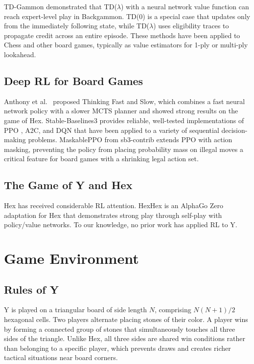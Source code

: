 \documentclass[conference]{IEEEtran}
\begin{document}
TD-Gammon \cite{tesauro1995} demonstrated that TD($\lambda$) with a neural
network value function can reach expert-level play in Backgammon. TD(0) is a
special case that updates only from the immediately following state, while
TD($\lambda$) uses eligibility traces to propagate credit across an entire
episode. These methods have been applied to Chess \cite{veness2009} and other
board games, typically as value estimators for 1-ply or multi-ply lookahead.

\subsection{Deep RL for Board Games}

Anthony et al.\ \cite{anthony2017} proposed Thinking Fast and Slow, which
combines a fast neural network policy with a slower MCTS planner and showed
strong results on the game of Hex. Stable-Baselines3 \cite{raffin2021} provides
reliable, well-tested implementations of PPO \cite{schulman2017}, A2C, and DQN
\cite{mnih2015} that have been applied to a variety of sequential decision-making
problems. MaskablePPO from sb3-contrib \cite{sb3contrib} extends PPO with action
masking, preventing the policy from placing probability mass on illegal moves a
critical feature for board games with a shrinking legal action set.

\subsection{The Game of Y and Hex}

Hex has received considerable RL attention. HexHex \cite{harbecke2025} is an
AlphaGo Zero adaptation for Hex that demonstrates strong play through self-play
with policy/value networks. To our knowledge, no prior work has applied RL to
Y.

\section{Game Environment}

\subsection{Rules of Y}

Y is played on a triangular board of side length $N$, comprising
$N(N+1)/2$ hexagonal cells. Two players alternate placing stones of their color.
A player wins by forming a connected group of stones that simultaneously touches
all three sides of the triangle. Unlike Hex, all three sides are shared win
conditions rather than belonging to a specific player, which prevents draws and
creates richer tactical situations near board corners.
\end{document}
